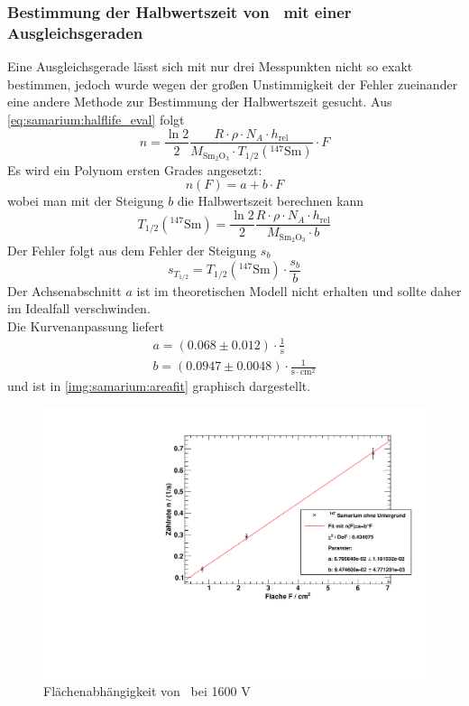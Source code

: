 \subsubsection{Bestimmung der Halbwertszeit von \samarium ~mit einer Ausgleichsgeraden}
Eine Ausgleichsgerade lässt sich mit nur drei Messpunkten nicht so exakt bestimmen, jedoch wurde wegen der großen Unstimmigkeit der Fehler 
zueinander eine andere Methode zur Bestimmung der Halbwertszeit gesucht.
Aus \autoref{eq:samarium:halflife_eval} folgt
\begin{equation}
   n = \frac{\ln 2}{2} \frac{R \cdot \rho \cdot N_A \cdot h_{\text{rel}}}{M_{\text{Sm}_2\text{O}_3} \cdot T_{1/2}({}^{147}\text{Sm})} \cdot F
\end{equation}
Es wird ein Polynom ersten Grades angesetzt:
\begin{equation}
  n(F) = a + b \cdot F
\end{equation}
wobei man mit der Steigung $b$ die Halbwertszeit berechnen kann
\begin{equation}
  T_{1/2}({}^{147}\text{Sm}) = \frac{\ln 2}{2} \frac{R \cdot \rho \cdot N_A \cdot h_{\text{rel}}}{M_{\text{Sm}_2\text{O}_3} \cdot b}
\end{equation}
Der Fehler folgt aus dem Fehler der Steigung $s_b$
\begin{equation}
  s_{T_{1/2}} = T_{1/2}({}^{147}\text{Sm}) \cdot \frac{s_b}{b}
\end{equation}
Der Achsenabschnitt $a$ ist im theoretischen Modell nicht erhalten und sollte daher im Idealfall verschwinden. \\[\baselineskip]
Die Kurvenanpassung liefert
\begin{gather}
  a = (0.068  \pm 0.012 ) \cdot \frac{1}{\text{s}} \\
  b = (0.0947 \pm 0.0048) \cdot \frac{1}{\text{s}\cdot \text{cm}^2}
\end{gather}
und ist in \autoref{img:samarium:areafit} graphisch dargestellt. 
\begin{figure}[H]
\begin{center}
  \includegraphics[width=15cm]{../img/Samarium147-Flaechenabhaengigkeit.pdf}
  \caption[Flächenabhängigkeit von \samarium]{Flächenabhängigkeit von \samarium\, bei 1600 V}
  \label{img:samarium:areafit}
\end{center}
\end{figure}
